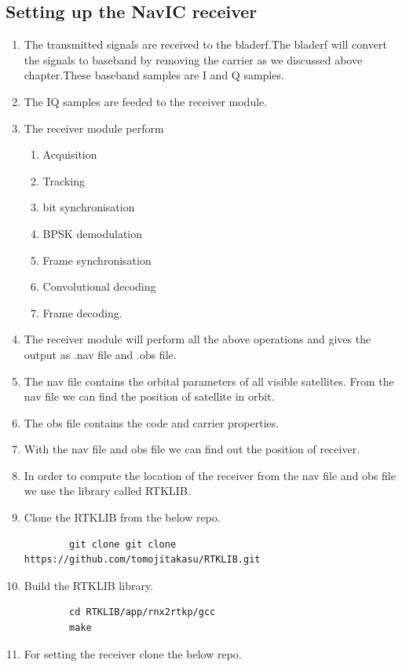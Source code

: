 \subsection{Setting up the NavIC receiver}
\begin{enumerate}
    \item The transmitted signals are received to the bladerf.The bladerf will convert the signals to baseband by removing the carrier as we discussed above chapter.These baseband samples are I and Q samples.
    \item The IQ samples are feeded to the receiver module.
    \item The receiver module perform
    \begin{enumerate}
        \item Acquisition
        \item Tracking
        \item bit synchronisation
        \item BPSK demodulation
        \item Frame synchronisation
        \item Convolutional decoding
        \item Frame decoding.
    \end{enumerate}
    \item The receiver module will perform all the above operations and gives the output as .nav file and .obs file.
    \item The nav file contains the orbital parameters of all visible satellites. From the nav file we can find the position of satellite in orbit.
    \item The obs file contains the code and carrier properties.
    \item With the nav file and obs file we can find out the position of receiver.
    \item In order to compute the location of the receiver from the nav file and obs file we use the library called RTKLIB.
    \item Clone the RTKLIB from the below repo.
    \begin{lstlisting}
        git clone git clone https://github.com/tomojitakasu/RTKLIB.git
    \end{lstlisting}
    \item Build the RTKLIB library.
    \begin{lstlisting}
        cd RTKLIB/app/rnx2rtkp/gcc
        make
    \end{lstlisting}
    \item For setting the receiver clone the below repo.

\end{enumerate}
